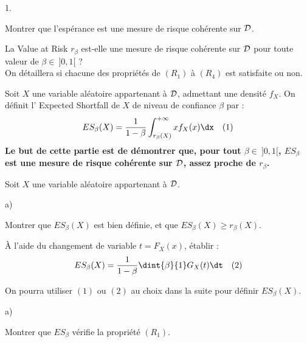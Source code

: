 \documentclass[11pt]{article}%
\begin{document}
\begin{noliste}{1.}
  \setlength{\itemsep}{4mm}
  \setcounter{enumi}{11}
  \item Montrer que l'espérance est une mesure de risque cohérente 
  sur ${\cal D}$.
  
  
  
  

  
  \item La \og Value at Risk \fg{} $r_\beta$ est-elle une mesure de 
  risque cohérente sur ${\cal D}$ pour toute valeur de $\beta \in \
  ]0,1[$ ?\\
  On détaillera si chacune des propriétés de $(R_1)$ à $(R_4)$ est 
  satisfaite ou non.
  
  

  Soit $X$ une variable aléatoire appartenant à ${\cal D}$, 
  admettant une densité $f_X$. On définit l' \og Expected 
  Shortfall\fg{} de $X$ de niveau de confiance $\beta$ par :
  \[
    ES_\beta(X)=\dfrac1{1-\beta} \int_{r_\beta(X)}^{+\infty} x 
    f_X(x) \dx \quad(1)
  \]
  {\bf Le but de cette partie est de démontrer que, pour tout 
  $\beta \in \ ]0,1[$, $ES_\beta$ est une mesure de risque cohérente 
  sur ${\cal D}$, assez \og proche \fg{} de $r_\beta$.}
  
  \item Soit $X$ une variable aléatoire appartenant à ${\cal D}$.
  \begin{noliste}{a)}
    \setlength{\itemsep}{2mm}
    \item Montrer que $ES_\beta(X)$ est bien définie, et que 
    $ES_\beta(X) \geq r_\beta(X)$.
    
    
    
    \item À l'aide du changement de variable $t=F_X(x)$, établir :
    \[
      ES_\beta(X)=\dfrac{1}{1-\beta} \dint{\beta}{1} G_X(t) \dt 
      \quad (2)
    \]
    
    
  \end{noliste}
  
  
  
  
  On pourra utiliser $(1)$ ou $(2)$ au choix dans la suite pour 
  définir $ES_\beta(X)$.
  
  \item
  \begin{noliste}{a)}
    \setlength{\itemsep}{2mm}
    \item Montrer que $ES_\beta$ vérifie la propriété $(R_1)$.
    
    


\end{noliste}
\end{noliste}
\end{document}
